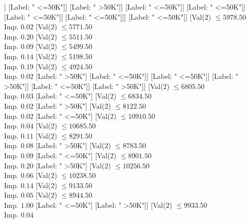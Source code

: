 \documentclass[margin=10pt]{standalone}
\begin{document}
\begin{forest}
																[Val($2$) $ \leq 990.50$ \\ Imp. $0.25$
																	[Label: " <=50K"]
																	[Label: " >50K"]]
																[Label: " <=50K"]]
															[Label: " >50K"]]
														[Label: " <=50K"]]
													[Label: " <=50K"]]
												[Label: " <=50K"]]
											[Label: " <=50K"]]]
									[Label: " <=50K"]]
								[Val($2$) $ \leq 5978.50$ \\ Imp. $0.02$
									[Val($2$) $ \leq 5771.50$ \\ Imp. $0.20$
										[Val($2$) $ \leq 5511.50$ \\ Imp. $0.09$
											[Val($2$) $ \leq 5499.50$ \\ Imp. $0.14$
												[Val($2$) $ \leq 5198.50$ \\ Imp. $0.19$
													[Val($2$) $ \leq 4924.50$ \\ Imp. $0.02$
														[Label: " >50K"]
														[Label: " <=50K"]]
													[Label: " <=50K"]]
												[Label: " >50K"]]
											[Label: " <=50K"]]
										[Label: " >50K"]]
									[Val($2$) $ \leq 6805.50$ \\ Imp. $0.03$
										[Label: " <=50K"]
										[Val($2$) $ \leq 6834.50$ \\ Imp. $0.02$
											[Label: " >50K"]
											[Val($2$) $ \leq 8122.50$ \\ Imp. $0.02$
												[Label: " <=50K"]
												[Val($2$) $ \leq 10910.50$ \\ Imp. $0.04$
													[Val($2$) $ \leq 10685.50$ \\ Imp. $0.11$
														[Val($2$) $ \leq 8291.50$ \\ Imp. $0.08$
															[Label: " >50K"]
															[Val($2$) $ \leq 8783.50$ \\ Imp. $0.09$
																[Label: " <=50K"]
																[Val($2$) $ \leq 8901.50$ \\ Imp. $0.20$
																	[Label: " >50K"]
																	[Val($2$) $ \leq 10256.50$ \\ Imp. $0.06$
																		[Val($2$) $ \leq 10238.50$ \\ Imp. $0.14$
																			[Val($2$) $ \leq 9133.50$ \\ Imp. $0.05$
																				[Val($2$) $ \leq 8944.50$ \\ Imp. $1.00$
																					[Label: " <=50K"]
																					[Label: " >50K"]]
																				[Val($2$) $ \leq 9933.50$ \\ Imp. $0.04$

\end{forest}
\end{document}

